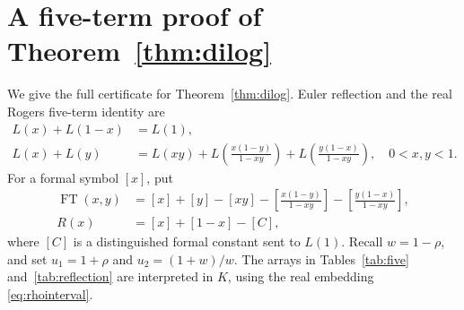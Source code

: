 \documentclass[11pt,reqno]{amsart}
\theoremstyle{remark}
\numberwithin{equation}{section}
\DeclareMathOperator{\FT}{FT}
\begin{document}
\section{A five-term proof of Theorem~\ref{thm:dilog}}
\label{app:certificate}\label{sec:certificate}
We give the full certificate for Theorem~\ref{thm:dilog}. Euler reflection
and the real Rogers five-term identity are
\begin{align}
 L(x)+L(1-x)&=L(1),\label{eq:reflection}\\
 L(x)+L(y)&=L(xy)+L\!\left(\frac{x(1-y)}{1-xy}\right)
 +L\!\left(\frac{y(1-x)}{1-xy}\right),\quad 0<x,y<1.
 \label{eq:fiveterm}
\end{align}
For a formal symbol $[x]$, put
\begin{align*}
 \FT(x,y)&=[x]+[y]-[xy]
 -\left[\frac{x(1-y)}{1-xy}\right]
 -\left[\frac{y(1-x)}{1-xy}\right],\\
 R(x)&=[x]+[1-x]-[C],
\end{align*}
where $[C]$ is a distinguished formal constant sent to $L(1)$.
Recall $w=1-\rho$, and set $u_1=1+\rho$ and $u_2=(1+w)/w$.
The arrays in Tables~\ref{tab:five} and~\ref{tab:reflection} are interpreted
in $K$, using the real embedding \eqref{eq:rhointerval}.
\end{document}
